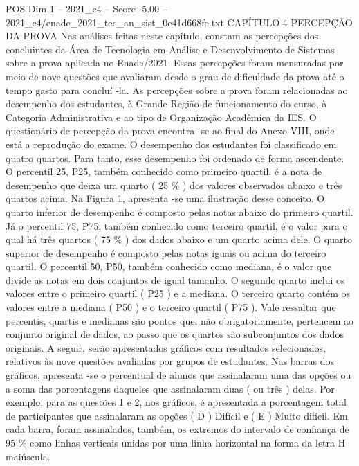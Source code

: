 \begin{textsample}{POS Dim 1 – 2021\_c4 – Score -5.00 – 2021\_c4/enade\_2021\_tec\_an\_sist\_0e41d668fe.txt}  \label{ex:f1_pos_380}
CAPÍTULO 4 PERCEPÇÃO DA PROVA Nas análises feitas neste capítulo, constam as percepções dos concluintes da Área de Tecnologia em Análise e Desenvolvimento de Sistemas sobre a prova aplicada no Enade/2021.
Essas percepções foram mensuradas por meio de nove questões que avaliaram desde o grau de dificuldade da prova até o tempo gasto para concluí -la.
As percepções sobre a prova foram relacionadas ao desempenho dos estudantes, à Grande Região de funcionamento do curso, à Categoria Administrativa e ao tipo de Organização Acadêmica da IES.
O questionário de percepção da prova encontra -se ao final do Anexo VIII, onde está a reprodução do exame.
O desempenho dos estudantes foi classificado em quatro quartos.
Para tanto, esse desempenho foi ordenado de forma ascendente.
O percentil 25, P25, também conhecido como primeiro quartil, é a nota de desempenho que deixa um quarto ( 25 \% ) dos valores observados abaixo e três quartos acima.
Na Figura 1, apresenta -se uma ilustração desse conceito.
O quarto inferior de desempenho é composto pelas notas abaixo do primeiro quartil.
Já o percentil 75, P75, também conhecido como terceiro quartil, é o valor para o qual há três quartos ( 75 \% ) dos dados abaixo e um quarto acima dele.
O quarto superior de desempenho é composto pelas notas iguais ou acima do terceiro quartil.
O percentil 50, P50, também conhecido como mediana, é o valor que divide as notas em dois conjuntos de igual tamanho.
O segundo quarto inclui os valores entre o primeiro quartil ( P25 ) e a mediana.
O terceiro quarto contém os valores entre a mediana ( P50 ) e o terceiro quartil ( P75 ).
Vale ressaltar que percentis, quartis e medianas são pontos que, não obrigatoriamente, pertencem ao conjunto original de dados, ao passo que os quartos são subconjuntos dos dados originais.
A seguir, serão apresentados gráficos com resultados selecionados, relativos às nove questões avaliadas por grupos de estudantes.
Nas barras dos gráficos, apresenta -se o percentual de alunos que assinalaram uma das opções ou a soma das porcentagens daqueles que assinalaram duas ( ou três ) delas.
Por exemplo, para as questões 1 e 2, nos gráficos, é apresentada a porcentagem total de participantes que assinalaram as opções ( D ) Difícil e ( E ) Muito difícil.
Em cada barra, foram assinalados, também, os extremos do intervalo de confiança de 95 \% como linhas verticais unidas por uma linha horizontal na forma da letra H maiúscula.

\end{textsample}
